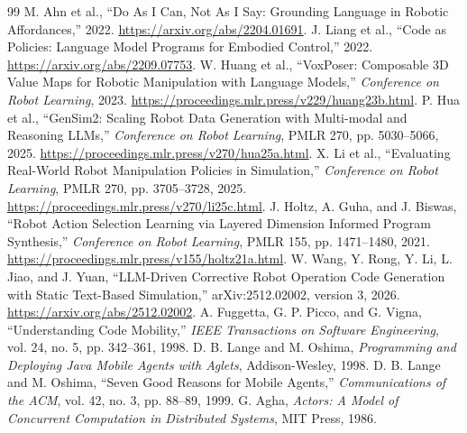 \documentclass[10pt,letterpaper]{article}
\begin{document}
\begin{thebibliography}{99}
 M. Ahn et al., ``Do As I Can, Not As I Say: Grounding Language in Robotic Affordances,'' 2022. \url{https://arxiv.org/abs/2204.01691}.
 J. Liang et al., ``Code as Policies: Language Model Programs for Embodied Control,'' 2022. \url{https://arxiv.org/abs/2209.07753}.
 W. Huang et al., ``VoxPoser: Composable 3D Value Maps for Robotic Manipulation with Language Models,'' \emph{Conference on Robot Learning}, 2023. \url{https://proceedings.mlr.press/v229/huang23b.html}.
 P. Hua et al., ``GenSim2: Scaling Robot Data Generation with Multi-modal and Reasoning LLMs,'' \emph{Conference on Robot Learning}, PMLR 270, pp. 5030--5066, 2025. \url{https://proceedings.mlr.press/v270/hua25a.html}.
 X. Li et al., ``Evaluating Real-World Robot Manipulation Policies in Simulation,'' \emph{Conference on Robot Learning}, PMLR 270, pp. 3705--3728, 2025. \url{https://proceedings.mlr.press/v270/li25c.html}.
 J. Holtz, A. Guha, and J. Biswas, ``Robot Action Selection Learning via Layered Dimension Informed Program Synthesis,'' \emph{Conference on Robot Learning}, PMLR 155, pp. 1471--1480, 2021. \url{https://proceedings.mlr.press/v155/holtz21a.html}.
 W. Wang, Y. Rong, Y. Li, L. Jiao, and J. Yuan, ``LLM-Driven Corrective Robot Operation Code Generation with Static Text-Based Simulation,'' arXiv:2512.02002, version 3, 2026. \url{https://arxiv.org/abs/2512.02002}.
 A. Fuggetta, G. P. Picco, and G. Vigna, ``Understanding Code Mobility,'' \emph{IEEE Transactions on Software Engineering}, vol. 24, no. 5, pp. 342--361, 1998.
 D. B. Lange and M. Oshima, \emph{Programming and Deploying Java Mobile Agents with Aglets}, Addison-Wesley, 1998.
 D. B. Lange and M. Oshima, ``Seven Good Reasons for Mobile Agents,'' \emph{Communications of the ACM}, vol. 42, no. 3, pp. 88--89, 1999.
 G. Agha, \emph{Actors: A Model of Concurrent Computation in Distributed Systems}, MIT Press, 1986.
\end{thebibliography}
\end{document}
